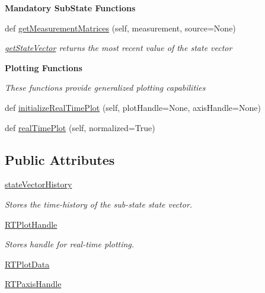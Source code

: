 \begin{Indent}{\bf Mandatory Sub\+State Functions}
\begin{DoxyCompactItemize}
def \hyperlink{classSubStates_1_1SubState_a9dcc51af847b7b946089dd73c387ca19}{get\+Measurement\+Matrices} (self, measurement, source=None)
\begin{DoxyCompactList}\small\item\em \hyperlink{classSubStates_1_1SubState_a3ebd1a120f63ed477ee76999518a8828}{get\+State\+Vector} returns the most recent value of the state vector \end{DoxyCompactList}\end{DoxyCompactItemize}
\end{Indent}
\begin{Indent}{\bf Plotting Functions}\par
{\em These functions provide generalized plotting capabilities }\begin{DoxyCompactItemize}
\item 
def \hyperlink{classSubStates_1_1SubState_ab1767fb43256809f722a9f6dc73fef19}{initialize\+Real\+Time\+Plot} (self, plot\+Handle=None, axis\+Handle=None)
\item 
def \hyperlink{classSubStates_1_1SubState_a8df931305220bef14684e76fd6743b0d}{real\+Time\+Plot} (self, normalized=True)
\end{DoxyCompactItemize}
\end{Indent}
\subsection*{Public Attributes}
\begin{DoxyCompactItemize}
\item 
\hyperlink{classSubStates_1_1SubState_a24bf2de56fc3037d91cba43d28f3bf60}{state\+Vector\+History}
\begin{DoxyCompactList}\small\item\em Stores the time-\/history of the sub-\/state state vector. \end{DoxyCompactList}\item 
\hyperlink{classSubStates_1_1SubState_ab92a0fafcfd778b8965e3f649ff94fc7}{R\+T\+Plot\+Handle}
\begin{DoxyCompactList}\small\item\em Stores handle for real-\/time plotting. \end{DoxyCompactList}\item 
\hyperlink{classSubStates_1_1SubState_aae3aa07f0d6f54a510db66e0644c958e}{R\+T\+Plot\+Data}
\item 
\hyperlink{classSubStates_1_1SubState_a41c912457be8682326d60f82cc651207}{R\+T\+Paxis\+Handle}
\end{DoxyCompactItemize}
